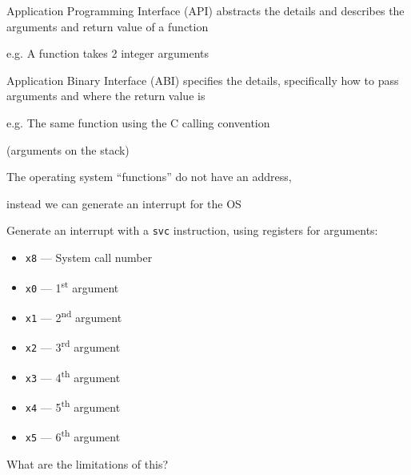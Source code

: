 \begin{slide}
  

  Application Programming Interface (API) abstracts the details and describes
  the arguments and return value of a function
  \medskip

  \leftspace{}e.g. A function takes 2 integer arguments
  \bigskip

  Application Binary Interface (ABI) specifies the details, specifically how to
  pass arguments and where the return value is
  \medskip

  \leftspace{}e.g. The same function using the C calling convention
  
  \leftspace{}(arguments on the stack)
\end{slide}

\begin{slide}
  

  The operating system ``functions'' do not have an address,
  
  \leftspace{}instead we can generate an interrupt for the OS
  \bigskip

  Generate an interrupt with a \texttt{svc} instruction, using registers for
  arguments:

  \begin{itemize}
    \item \texttt{x8} --- System call number
    \item \texttt{x0} --- 1\textsuperscript{st} argument
    \item \texttt{x1} --- 2\textsuperscript{nd} argument
    \item \texttt{x2} --- 3\textsuperscript{rd} argument
    \item \texttt{x3} --- 4\textsuperscript{th} argument
    \item \texttt{x4} --- 5\textsuperscript{th} argument
    \item \texttt{x5} --- 6\textsuperscript{th} argument
  \end{itemize}
  \bigskip

  What are the limitations of this?
\end{slide}

